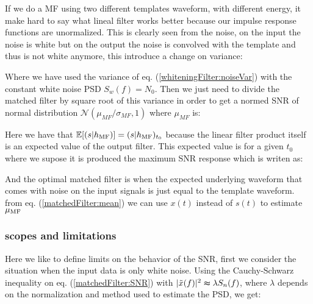 \newp If we do a MF using two different templates waveform, with different energy, it make hard to say what lineal filter works better because our impulse response functions are unormalized. This is clearly seen from the noise, on the input the noise is white but on the output the noise is convolved with the template and thus is not white anymore, this introduce a change on variance:


\newp Where we have used the variance of eq. (\ref{whiteningFilter:noiseVar}) with the constant white noise PSD $S_w(f) = N_0$. Then we just need to divide the matched filter by square root of this variance in order to get a normed SNR of normal distribution $\mathcal{N}(\mu_{MF} / \sigma_{MF}, 1)$ where $\mu_{MF}$ is:


\newp Here we have that $\mathbb{E}[(s|h_{\text{MF}})] = (s|h_{\text{MF}})_{t_0}$ because the linear filter product itself is an expected value of the output filter. This expected value is for a given $t_0$ where we supose it is produced the maximum SNR response which is writen as:


\newp And the optimal matched filter is when the expected underlying waveform that comes with noise on the input signals is just equal to the template waveform. from eq. (\ref{matchedFilter:mean}) we can use $x(t)$ instead of $s(t)$ to estimate $\mu_{\text{MF}}$

\subsubsection{scopes and limitations}{\label{sec:signalDetect::ssec:MF::sssec:scopes}}

\newp Here we like to define limits on the behavior of the SNR, first we consider the situation when the input data is only white noise. Using the Cauchy-Schwarz inequality  on eq. (\ref{matchedFilter:SNR}) with $|\tilde{x}(f)|^{2} \thickapprox \lambda S_n(f)$, where $\lambda$ depends on the normalization and method used to estimate the PSD, we get:



